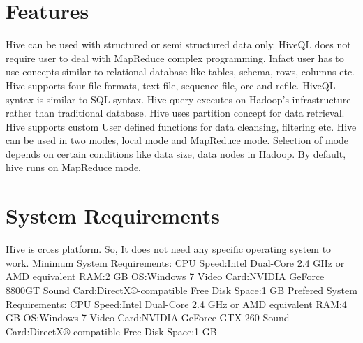 \documentclass[9pt,twocolumn,twoside]{../../styles/osajnl}
\begin{document}
\section{Features}
Hive can be used with structured or semi structured data only.\newline
HiveQL does not require user to deal with MapReduce complex programming. \newline
Infact user has to use concepts similar to relational database like tables, schema, rows, columns etc.\newline
Hive supports four file formats, text file, sequence file, orc and rcfile.\newline
HiveQL syntax is similar to SQL syntax.\newline
Hive query executes on Hadoop’s infrastructure rather than traditional database.\newline
Hive uses partition concept for data retrieval.\newline
Hive supports custom User defined functions for data cleansing, filtering etc. \newline
Hive can be used in two modes, local mode and MapReduce mode.\newline
Selection of mode depends on certain conditions like data size, data nodes in Hadoop.\newline
By default, hive runs on MapReduce mode.\newline
\cite{gr}

\section{System Requirements}
Hive is cross platform. So, It does not need any specific operating system to work.\newline
Minimum System Requirements:\newline
CPU Speed:Intel Dual-Core 2.4 GHz or AMD equivalent\newline
RAM:2 GB\newline
OS:Windows 7\newline
Video Card:NVIDIA GeForce 8800GT\newline
Sound Card:DirectX®-compatible\newline
Free Disk Space:1 GB\newline
Prefered System Requirements:\newline
CPU Speed:Intel Dual-Core 2.4 GHz or AMD equivalent\newline
RAM:4 GB\newline
OS:Windows 7\newline
Video Card:NVIDIA GeForce GTX 260\newline
Sound Card:DirectX®-compatible\newline
Free Disk Space:1 GB\newline \cite{sr}
\end{document}
